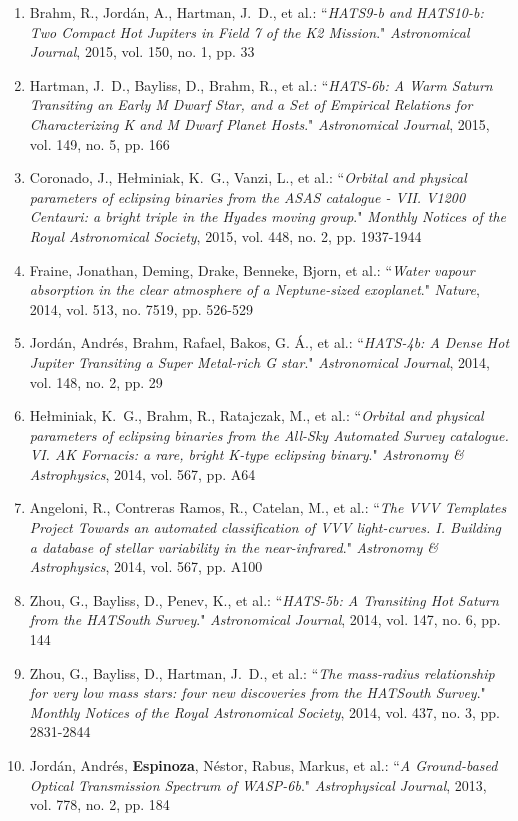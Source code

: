 \documentclass[12pt, a4paper]{article} %
\begin{document}
\begin{flushleft}
\begin{enumerate}
\item Brahm, R., Jordán, A., Hartman, J.~D., et al.: ``\textit{HATS9-b and HATS10-b: Two Compact Hot Jupiters in Field 7 of the K2 Mission}." \textit{Astronomical Journal}, 2015, vol. 150, no. 1, pp. 33
\item Hartman, J.~D., Bayliss, D., Brahm, R., et al.: ``\textit{HATS-6b: A Warm Saturn Transiting an Early M Dwarf Star, and a Set of Empirical Relations for Characterizing K and M Dwarf Planet Hosts}." \textit{Astronomical Journal}, 2015, vol. 149, no. 5, pp. 166
\item Coronado, J., Hełminiak, K.~G., Vanzi, L., et al.: ``\textit{Orbital and physical parameters of eclipsing binaries from the ASAS catalogue - VII. V1200 Centauri: a bright triple in the Hyades moving group}." \textit{Monthly Notices of the Royal Astronomical Society}, 2015, vol. 448, no. 2, pp. 1937-1944
\item Fraine, Jonathan, Deming, Drake, Benneke, Bjorn, et al.: ``\textit{Water vapour absorption in the clear atmosphere of a Neptune-sized exoplanet}." \textit{Nature}, 2014, vol. 513, no. 7519, pp. 526-529
\item Jordán, Andrés, Brahm, Rafael, Bakos, G. Á., et al.: ``\textit{HATS-4b: A Dense Hot Jupiter Transiting a Super Metal-rich G star}." \textit{Astronomical Journal}, 2014, vol. 148, no. 2, pp. 29
\item Hełminiak, K.~G., Brahm, R., Ratajczak, M., et al.: ``\textit{Orbital and physical parameters of eclipsing binaries from the All-Sky Automated Survey catalogue. VI. AK Fornacis: a rare, bright K-type eclipsing binary}." \textit{Astronomy \& Astrophysics}, 2014, vol. 567, pp. A64
\item Angeloni, R., Contreras Ramos, R., Catelan, M., et al.: ``\textit{The VVV Templates Project Towards an automated classification of VVV light-curves. I. Building a database of stellar variability in the near-infrared}." \textit{Astronomy \& Astrophysics}, 2014, vol. 567, pp. A100
\item Zhou, G., Bayliss, D., Penev, K., et al.: ``\textit{HATS-5b: A Transiting Hot Saturn from the HATSouth Survey}." \textit{Astronomical Journal}, 2014, vol. 147, no. 6, pp. 144
\item Zhou, G., Bayliss, D., Hartman, J.~D., et al.: ``\textit{The mass-radius relationship for very low mass stars: four new discoveries from the HATSouth Survey}." \textit{Monthly Notices of the Royal Astronomical Society}, 2014, vol. 437, no. 3, pp. 2831-2844
\item Jordán, Andrés, \textbf{Espinoza}, Néstor, Rabus, Markus, et al.: ``\textit{A Ground-based Optical Transmission Spectrum of WASP-6b}." \textit{Astrophysical Journal}, 2013, vol. 778, no. 2, pp. 184

\end{enumerate}
\end{flushleft}
\end{document}
